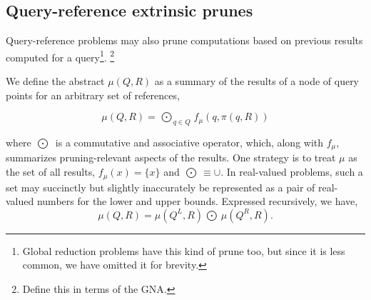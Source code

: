 \documentclass[times, 10pt,twocolumn]{article}
\newcommand{\union}{\cup}
\newcommand{\kdleft}[1]{#1^{\!L}}
\newcommand{\kdright}[1]{#1^{\!R}}
\newcommand{\lo}[1]{#1^{\!l}}
\newcommand{\distlo}[1]{\lo{d_{\text{hrect}}}}
\newcommand{\myOp}[1]{\mathop{\bigotimes\nolimits\!\!_{#1}}}
\newcommand{\myOutop}[1]{\mathop{\bigodot\nolimits\!\!_{#1}}}
\newcommand{\myoutop}[1]{\mathop{\bigodot\nolimits\!\!_{#1}}}
\newcommand{\outpi}{\Pi}
\newcommand{\Oppi}{\myOp{\outpi}}
\newcommand{\fpi}{f_{\outpi}}
\newcommand{\gpi}{g_{\outpi}}
\newcommand{\outrho}{\rho}
\newcommand{\Oprho}{\myOp{\rho}}
\newcommand{\frho}{f_{\rho}}
\newcommand{\grho}{g_{\rho}}
\newcommand{\letterqr}{\pi}
\newcommand{\inqr}{\pi}
\newcommand{\Opqr}{\myOp{\letterqr}}
\newcommand{\inmu}{\mu}
\newcommand{\Outopmu}{\myOutop{\mu}}
\newcommand{\outopmu}{\myoutop{\mu}}
\newcommand{\fmu}{f_{\mu}}
\newcommand{\namestat}[1]{\Sigma_{\text{#1}}}
\newcommand{\outstat}{\Sigma}
\begin{document}



\subsection{Query-reference extrinsic prunes}

Query-reference problems may also prune computations based on previous results computed for a query\footnote{Global reduction problems have this kind of prune too, but since it is less common, we have omitted it for brevity.}.
\footnote{Define this in terms of the GNA.}


We define the abstract $\inmu(Q, R)$ as a summary of the results of a node of query points for an arbitrary set of references,

\begin{equation}
\inmu(Q, R) = \Outopmu_{q \in Q} \fmu(q, \inqr(q, R))
\label{eqn:defmu}
\end{equation}

\noindent where $\Outopmu$ is a commutative and associative operator, which, along with $\fmu$, summarizes pruning-relevant aspects of the results.
One strategy is to treat $\inmu$ as the set of all results, $\fmu(x) = \{x\}$ and $\Outopmu \equiv \union$.
In real-valued problems, such a set may succinctly but slightly inaccurately be represented as a pair of real-valued numbers for the lower and upper bounds.
Expressed recursively, we have,
\begin{equation}
\inmu(Q, R) = \inmu(\kdleft{Q}, R) \outopmu \inmu(\kdright{Q}, R).
\label{eqn:dividemu}
\end{equation}
\end{document}
